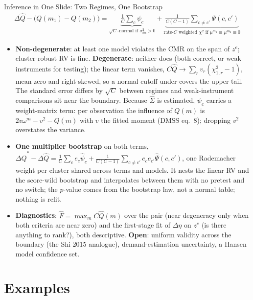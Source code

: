 \documentclass[aspectratio=169,10pt]{beamer}
\begin{document}
\begin{frame}{Inference in One Slide: Two Regimes, One Bootstrap}
\footnotesize
\begin{align*}
\Delta\widehat{Q} - \big(Q(m_1) - Q(m_2)\big) = \underbrace{\tfrac{1}{C} \textstyle\sum_c \psi_c}_{\sqrt{C}\text{-normal if } \sigma^2_{\text{lin}} > 0} + \underbrace{\tfrac{1}{C(C-1)} \textstyle\sum_{c \neq c'} \Psi(c,c')}_{\text{rate-}C\text{ weighted } \chi^2 \text{ if } \mu^{m_1} \equiv \mu^{m_2} \equiv 0}
\end{align*}
\begin{itemize}
\item \textbf{Non-degenerate}: at least one model violates the CMR on the span of $z^e$; cluster-robust RV is fine. \textbf{Degenerate}: neither does (both correct, or weak instruments for testing); the linear term vanishes, $C\widehat{Q} \rightarrow \sum_r v_r(\chi^2_{1,r} - 1)$, mean zero and right-skewed, so a normal cutoff under-covers the upper tail. The standard error differs by $\sqrt{C}$ between regimes and weak-instrument comparisons sit near the boundary. Because $\widehat{\Sigma}$ is estimated, $\psi_c$ carries a weight-matrix term: per observation the influence of $Q(m)$ is $2v\omega^m - v^2 - Q(m)$ with $v$ the fitted moment (DMSS eq.~8); dropping $v^2$ overstates the variance.
\item \textbf{One multiplier bootstrap} on both terms, $\Delta\widehat{Q}^* - \Delta\widehat{Q} = \frac{1}{C}\sum_c e_c \widehat{\psi}_c + \frac{1}{C(C-1)}\sum_{c \neq c'} e_c e_{c'} \widehat{\Psi}(c,c')$, one Rademacher weight per cluster shared across terms and models. It nests the linear RV and the score-wild bootstrap and interpolates between them with no pretest and no switch; the $p$-value comes from the bootstrap law, not a normal table; nothing is refit.
\item \textbf{Diagnostics}: $\widehat{F} = \max_m C\widehat{Q}(m)$ over the pair (near degeneracy only when \alert{both} criteria are near zero) and the first-stage fit of $\Delta\eta$ on $z^e$ (is there anything to rank?), both descriptive. \textbf{Open}: uniform validity across the boundary (the Shi 2015 analogue), demand-estimation uncertainty, a Hansen model confidence set.
\end{itemize}
\end{frame}


\section{Examples}
\end{document}
